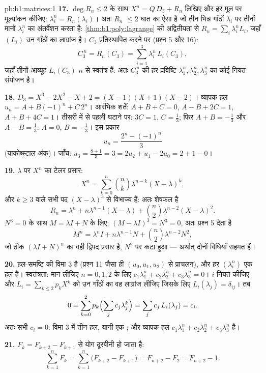 \begin{solution}{pb:b1:matrices:1}
\textbf{17.} $\deg R_n \leq 2$ के साथ $X^n = Q\,D_3 + R_n$ लिखिए और हर मूल
पर मूल्यांकन कीजिए: $\lambda_i^n = R_n(\lambda_i)$। अतः $R_n$ $\leq 2$ घात
का ऐसा  है जो तीन भिन्न गाँठों $\lambda_i$ पर तीनों मानों $\lambda_i^n$
का अंतर्वेशन करता है: \cref{thm:b1:poly:lagrange} की अद्वितीयता से $R_n =
\sum_i \lambda_i^n L_i$, जहाँ $(L_i)$ उन गाँठों का लाग्रांज  है। $C_3$
प्रतिस्थापित करने पर (प्रश्न 5 और 16):
\[
C_3^{\,n} = R_n(C_3) = \sum_{i=1}^{3} \lambda_i^n\,L_i(C_3),
\]
जहाँ तीनों आव्यूह $L_i(C_3)$ $n$ से स्वतंत्र हैं: अतः $C_3^{\,n}$ की हर
प्रविष्टि $\lambda_1^n, \lambda_2^n, \lambda_3^n$ का कोई नियत संयोजन है।

\textbf{18.} $D_3 = X^3 - 2X^2 - X + 2 = (X-1)(X+1)(X-2)$। व्यापक हल $u_n =
A + B(-1)^n + C\,2^n$। आरंभिक शर्तें: $A + B + C = 0$, $A - B + 2C = 1$, $A
+ B + 4C = 1$। तीसरी में से पहली घटाने पर: $3C = 1$, $C = \frac13$; फिर $A +
B = -\frac13$ और $A - B = \frac13$: $A = 0$, $B = -\frac13$। इस प्रकार
\[
u_n = \frac{2^n - (-1)^n}{3}
\]
(याकोब्स्टाल अंक)। जाँच: $u_3 = \frac{8 + 1}{3} = 3 = 2u_2 + u_1 - 2u_0 = 2
+ 1 - 0$।

\textbf{19.} $\lambda$ पर  $X^n$ का टेलर प्रसार:
\[
X^n = \sum_{k=0}^{n} \binom nk \lambda^{n-k}(X - \lambda)^k ,
\]
और $k \geq 3$ वाले सभी पद $(X - \lambda)^3$ से विभाज्य हैं: अतः शेषफल है
\[
R_n = \lambda^n + n\lambda^{n-1}(X - \lambda) + \binom
n2\lambda^{n-2}(X - \lambda)^2 .
\]
$N^3 = 0$ के साथ $M = \lambda I + N$ के लिए: $(M - \lambda I)^3 = N^3 = 0$,
अतः प्रश्न 5 देता है
\[
M^n = \lambda^n I + n\lambda^{n-1} N + \binom n2
\lambda^{n-2} N^2 ,
\]
जो ठीक $(\lambda I + N)^n$ का वही द्विपद प्रसार है, $N^2$ पर कटा हुआ ---
अर्थात् दोनों विधियाँ सहमत हैं।

\textbf{20.} हल-समष्टि की विमा $3$ है (प्रश्न 11 जैसा ही $(u_0, u_1, u_2)$
से प्राचलन), और हर $(\lambda_i^n)$ एक हल है। स्वतंत्रता: मान लीजिए $n = 0,
1, 2$ के लिए $c_1\lambda_1^n + c_2\lambda_2^n + c_3\lambda_3^n = 0$। $i$
नियत कीजिए और $L_i = \sum_{k \leq 2} p_k X^k$ को उन गाँठों का वह लाग्रांज
 लीजिए जिसके लिए $L_i(\lambda_j) = \delta_{ij}$। तब
\[
0 = \sum_{k=0}^{2} p_k\Bigl(\sum_j c_j\lambda_j^k\Bigr)
= \sum_j c_j\,L_i(\lambda_j) = c_i .
\]
अतः सभी $c_i = 0$: विमा $3$ में तीन  हल, यानी एक ; और व्यापक हल
$c_1\lambda_1^n + c_2\lambda_2^n + c_3\lambda_3^n$ है।

\textbf{21.} $F_k = F_{k+2} - F_{k+1}$ से योग दूरबीनी हो जाता है:
\[
\sum_{k=1}^{n} F_k = \sum_{k=1}^{n}\bigl(F_{k+2} - F_{k+1}\bigr)
= F_{n+2} - F_2 = F_{n+2} - 1 .
\]


\end{solution}
